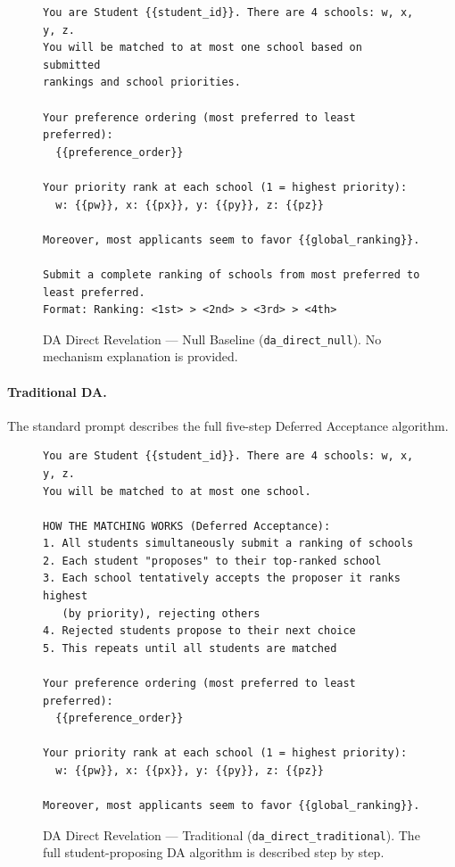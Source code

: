 \begin{figure}[H]
\begin{lstlisting}
You are Student {{student_id}}. There are 4 schools: w, x, y, z.
You will be matched to at most one school based on submitted
rankings and school priorities.

Your preference ordering (most preferred to least preferred):
  {{preference_order}}

Your priority rank at each school (1 = highest priority):
  w: {{pw}}, x: {{px}}, y: {{py}}, z: {{pz}}

Moreover, most applicants seem to favor {{global_ranking}}.

Submit a complete ranking of schools from most preferred to
least preferred.
Format: Ranking: <1st> > <2nd> > <3rd> > <4th>
\end{lstlisting}
\caption{DA Direct Revelation --- Null Baseline (\texttt{da\_direct\_null}). No mechanism explanation is provided.}
\label{fig:da-direct-null}
\end{figure}

\paragraph{Traditional DA.}
The standard prompt describes the full five-step Deferred Acceptance algorithm.

\begin{figure}[H]
\begin{lstlisting}
You are Student {{student_id}}. There are 4 schools: w, x, y, z.
You will be matched to at most one school.

HOW THE MATCHING WORKS (Deferred Acceptance):
1. All students simultaneously submit a ranking of schools
2. Each student "proposes" to their top-ranked school
3. Each school tentatively accepts the proposer it ranks highest
   (by priority), rejecting others
4. Rejected students propose to their next choice
5. This repeats until all students are matched

Your preference ordering (most preferred to least preferred):
  {{preference_order}}

Your priority rank at each school (1 = highest priority):
  w: {{pw}}, x: {{px}}, y: {{py}}, z: {{pz}}

Moreover, most applicants seem to favor {{global_ranking}}.
\end{lstlisting}
\caption{DA Direct Revelation --- Traditional (\texttt{da\_direct\_traditional}). The full student-proposing DA algorithm is described step by step.}
\label{fig:da-direct-traditional}
\end{figure}


